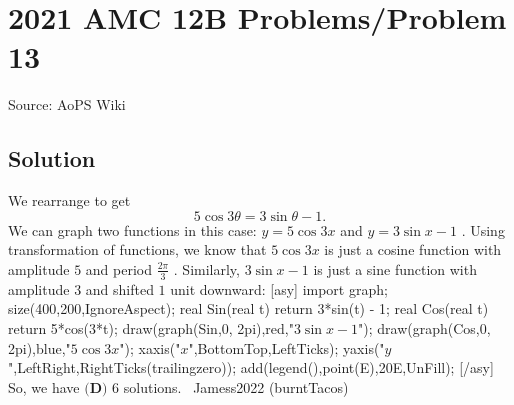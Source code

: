 \documentclass[12pt]{article}
\begin{document}
\section*{{2021 AMC 12B Problems/Problem 13}}
Source: AoPS Wiki

\subsection*{Solution}
We rearrange to get \[5\cos3\theta = 3\sin\theta-1.\] We can graph two functions in this case: $y=5\cos{3x}$ and $y=3\sin{x} -1$ .
Using transformation of functions, we know that $5\cos{3x}$ is just a cosine function with amplitude $5$ and period $\frac{2\pi}{3}$ . Similarly, $3\sin{x} -1$ is just a sine function with amplitude $3$ and shifted $1$ unit downward: [asy] import graph; size(400,200,IgnoreAspect); real Sin(real t) {return 3*sin(t) - 1;} real Cos(real t) {return 5*cos(3*t);} draw(graph(Sin,0, 2pi),red,"$3\sin{x} -1 $"); draw(graph(Cos,0, 2pi),blue,"$5\cos{3x}$"); xaxis("$x$",BottomTop,LeftTicks); yaxis("$y$",LeftRight,RightTicks(trailingzero)); add(legend(),point(E),20E,UnFill); [/asy] So, we have $\boxed{\textbf{(D) }6}$ solutions. ~Jamess2022 (burntTacos)
\end{document}
